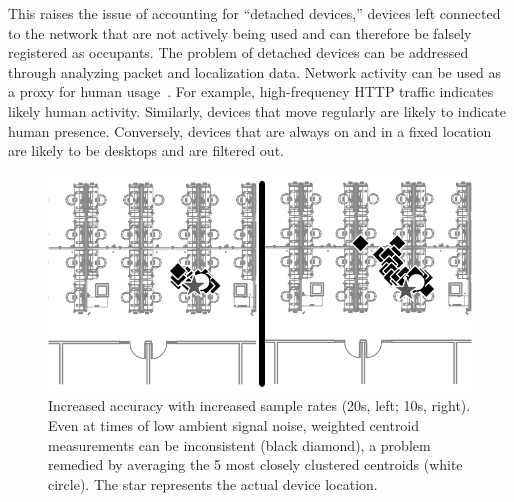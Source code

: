 This raises the issue of accounting for ``detached devices,'' devices left connected to the network that are not actively being used and can therefore be falsely registered as occupants. The problem of detached devices can be addressed through analyzing packet and localization data. Network activity can be used as a proxy for human usage~\cite{Nedevschi2009}. For example, high-frequency HTTP traffic indicates likely human activity. Similarly, devices that move regularly are likely to indicate human presence. Conversely, devices that are always on and in a fixed location are likely to be desktops and are filtered out.



\begin{figure}[htb]
\begin{center}
\includegraphics[width=.6\linewidth]{figs/samplesize}
\end{center}
\caption{Increased accuracy with increased sample rates (20s, left; 10s, right). Even at times of low ambient signal noise, weighted centroid measurements can be inconsistent (black diamond), a problem remedied by averaging the 5 most closely clustered centroids (white circle). The star represents the actual device location.}
\label{fig:samplesize}
\end{figure}
